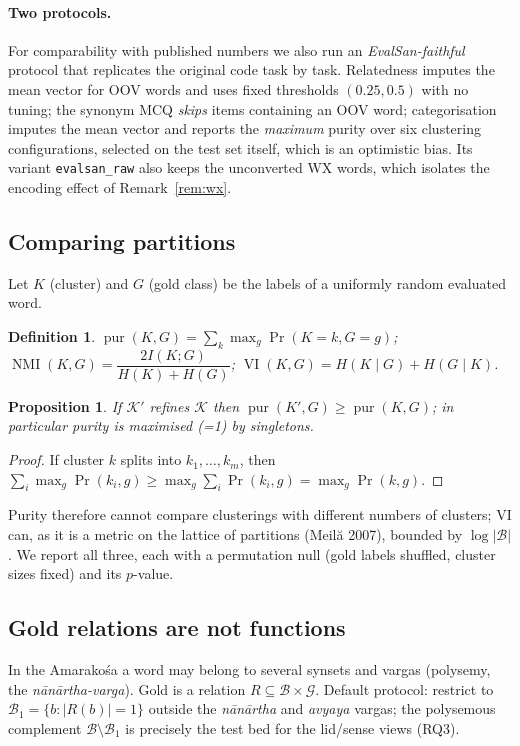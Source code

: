 \documentclass[11pt,a4paper]{article}
\newtheorem{definition}{Definition}
\newtheorem{proposition}{Proposition}
\theoremstyle{remark}\newtheorem{remark}{Remark}
\newcommand{\B}{\mathcal{B}}            %
\newcommand{\VI}{\operatorname{VI}}
\newcommand{\NMI}{\operatorname{NMI}}
\newcommand{\pur}{\operatorname{pur}}
\newcommand{\vk}[1]{\textsf{#1}}         %
\begin{document}
\paragraph{Two protocols.} For comparability with published numbers we also
run an \emph{EvalSan-faithful} protocol that replicates the original code task
by task. Relatedness imputes the mean vector for OOV words and uses fixed
thresholds $(0.25,0.5)$ with no tuning; the synonym MCQ \emph{skips} items
containing an OOV word; categorisation imputes the mean vector and reports the
\emph{maximum} purity over six clustering configurations, selected on the
test set itself, which is an optimistic bias. Its variant
\texttt{evalsan\_raw} also keeps the unconverted WX words, which isolates the
encoding effect of Remark~\ref{rem:wx}.

\subsection{Comparing partitions}
Let $K$ (cluster) and $G$ (gold class) be the labels of a uniformly random
evaluated word.
\begin{definition}
$\pur(K,G)=\sum_{k}\max_g\Pr(K=k,G=g)$;\quad
$\NMI(K,G)=\dfrac{2I(K;G)}{H(K)+H(G)}$;\quad
$\VI(K,G)=H(K\mid G)+H(G\mid K)$.
\end{definition}
\begin{proposition}
If $\mathcal{K}'$ refines $\mathcal{K}$ then $\pur(K',G)\ge\pur(K,G)$; in
particular purity is maximised (=1) by singletons.
\end{proposition}
\begin{proof}
If cluster $k$ splits into $k_1,\dots,k_m$, then
$\sum_i\max_g\Pr(k_i,g)\ge\max_g\sum_i\Pr(k_i,g)=\max_g\Pr(k,g)$.
\end{proof}
\noindent Purity therefore cannot compare clusterings with different numbers
of clusters; VI can, as it is a metric on the lattice of partitions (Meilă
2007), bounded by $\log|\B|$. We report all three, each with a permutation
null (gold labels shuffled, cluster sizes fixed) and its $p$-value.

\subsection{Gold relations are not functions}
In the Amarakośa a word may belong to several synsets and vargas (polysemy,
the \emph{nānārtha-varga}). Gold is a relation $R\subseteq\B\times\mathcal{G}$.
Default protocol: restrict to $\B_1=\{b:|R(b)|=1\}$ outside the
\emph{nānārtha} and \emph{avyaya} vargas; the polysemous complement
$\B\setminus\B_1$ is precisely the test bed for the \vk{lid}/\vk{sense} views
(RQ3).
\end{document}
